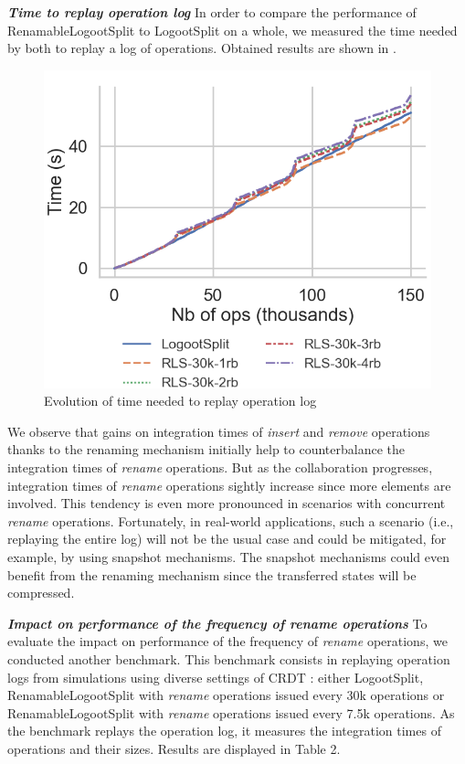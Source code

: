\documentclass[10pt,journal,compsoc]{IEEEtran}
\let\MYoriglatexcaption\caption
\renewcommand{\caption}[2][\relax]{\MYoriglatexcaption[#2]{#2}}
\newcommand{\headerparagraph}[1]{\textbf{\emph{#1}}\quad}
\begin{document}
\headerparagraph{Time to replay operation log}
%
In order to compare the performance of RenamableLogootSplit to LogootSplit on a whole, we measured the time needed by both to replay a log of operations.
Obtained results are shown in .

\begin{figure}[!ht]
    \centering
    \includegraphics[width=0.7\columnwidth]{img/replay-log-30k-with-legend.png}
    \caption{Evolution of time needed to replay operation log}
    \label{fig:time-to-replay-log}
\end{figure}

We observe that gains on integration times of \emph{insert} and \emph{remove} operations thanks to the renaming mechanism initially help to counterbalance the integration times of \emph{rename} operations.
But as the collaboration progresses, integration times of \emph{rename} operations sightly increase since more elements are involved.
This tendency is even more pronounced in scenarios with concurrent \emph{rename} operations.
Fortunately, in real-world applications, such a scenario (i.e., replaying the entire log) will not be the usual case and could be mitigated, for example, by using snapshot mechanisms.
The snapshot mechanisms could even benefit from the renaming mechanism since the transferred states will be compressed.

\headerparagraph{Impact on performance of the frequency of \emph{rename} operations}
%
To evaluate the impact on performance of the frequency of \emph{rename} operations, we conducted another benchmark.
This benchmark consists in replaying operation logs from simulations using diverse settings of \ac{CRDT} : either LogootSplit, RenamableLogootSplit with \emph{rename} operations issued every 30k operations or RenamableLogootSplit with \emph{rename} operations issued every 7.5k operations.
As the benchmark replays the operation log, it measures the integration times of operations and their sizes.
Results are displayed in Table 2.
\end{document}
